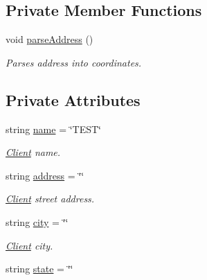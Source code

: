 \subsection*{Private Member Functions}
\begin{DoxyCompactItemize}
\item 
void \hyperlink{classClient_a6953fb1cd2e5a4fa87ee08479072a402}{parse\+Address} ()
\begin{DoxyCompactList}\small\item\em Parses address into coordinates. \end{DoxyCompactList}\end{DoxyCompactItemize}
\subsection*{Private Attributes}
\begin{DoxyCompactItemize}
\item 
string \hyperlink{classClient_a456e36f9972a8bf3ecdb5f0e70b3bd5d}{name} = \char`\"{}T\+E\+ST\char`\"{}\hypertarget{classClient_a456e36f9972a8bf3ecdb5f0e70b3bd5d}{}\label{classClient_a456e36f9972a8bf3ecdb5f0e70b3bd5d}

\begin{DoxyCompactList}\small\item\em \hyperlink{classClient}{Client} name. \end{DoxyCompactList}\item 
string \hyperlink{classClient_a6355d7fc34358ed4ceac7985f7c46e6e}{address} = \char`\"{}\char`\"{}\hypertarget{classClient_a6355d7fc34358ed4ceac7985f7c46e6e}{}\label{classClient_a6355d7fc34358ed4ceac7985f7c46e6e}

\begin{DoxyCompactList}\small\item\em \hyperlink{classClient}{Client} street address. \end{DoxyCompactList}\item 
string \hyperlink{classClient_a583900f81428de47df9296d49022e022}{city} = \char`\"{}\char`\"{}\hypertarget{classClient_a583900f81428de47df9296d49022e022}{}\label{classClient_a583900f81428de47df9296d49022e022}

\begin{DoxyCompactList}\small\item\em \hyperlink{classClient}{Client} city. \end{DoxyCompactList}\item 
string \hyperlink{classClient_a4e50f1a7dc56fc407b43ee88340ba032}{state} = \char`\"{}\char`\"{}\hypertarget{classClient_a4e50f1a7dc56fc407b43ee88340ba032}{}\label{classClient_a4e50f1a7dc56fc407b43ee88340ba032}


\end{DoxyCompactItemize}
